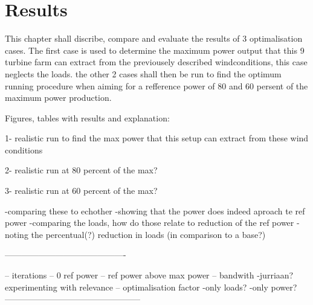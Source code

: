 \section{Results}

This chapter shall discribe, compare and evaluate the results of 3 optimalisation cases. The first case is used to determine the maximum power output that this 9 turbine farm can extract from the previousely described windconditions, this case neglects the loads. the other 2 cases shall then be run to find the optimum running procedure when aiming for a refference power of 80 and 60 persent of the maximum power production. 

Figures, tables with results and explanation:
   
	1- realistic run to find the max power that this setup can extract from these wind conditions

	2- realistic run at 80 percent of the max? 
	
	3- realistic run at 60 percent of the max? 

  		-comparing these to echother
    	-showing that the power does indeed aproach te ref power
    	-comparing the loads, how do those relate to reduction of the ref power
  		-noting the percentual(?) reduction in loads (in comparison to a base?)
 
-------------------------------------------
  
-- iterations
-- 0 ref power
-- ref power above max power  
-- bandwith
       -jurriaan? experimenting with relevance 
-- optimalisation factor 
       -only loads?
       -only power?
------------------------------------------------       
         